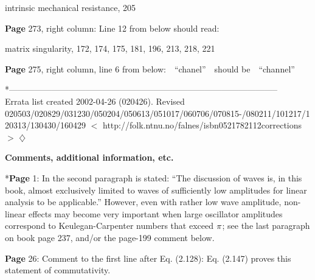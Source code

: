 \documentclass[a4paper,12pt]{article}
\begin{document}
intrinsic mechanical resistance, 205 %
\vspace{0.2cm}

\noindent %
{\bf Page} 273, right column: Line 12 from below should read: 

matrix singularity, 172, 174, 175, 181, 196, 213, 218, 221 %
\vspace{0.2cm}

\noindent %
{\bf Page} 275, right column, line 6 from below: \,\, ``chanel'' \,\, should be \,\, ``channel'' 
\vspace{0.1cm}

\noindent
*----------------------------------------------------------------------------------------------- \\
Errata list created 2002-04-26 (020426). %
\newline \noindent 
Revised 020503/020829/031230/050204/050613/051017/060706/070815-\newline/080211/101217/120313/130430/160429 %
\newline
$<$ http://folk.ntnu.no/falnes/isbn0521782112corrections $>$
\newline  
{$\diamondsuit$} %


\pagebreak %

\centerline{{\bf Comments, additional information, etc.}}

\vspace{0.3cm}

\noindent %
*{\bf Page} 1: In the second paragraph is stated: ``The discussion of waves is, in this book, almost exclusively limited to waves of sufficiently low amplitudes for linear analysis to be applicable.'' However, even with rather low wave amplitude, non-linear effects may become very important when large oscillator amplitudes correspond to Keulegan-Carpenter numbers that exceed $\rm{\pi}$; see the last paragraph on book page 237, and/or the page-199 comment below. 
\newline  {$\diamondsuit$}  \vspace{0.15cm} %

\noindent %
{\bf Page} 26: Comment to the first line after Eq. (2.128): Eq. (2.147) proves this statement of commutativity. %
\vspace{0.2cm}
\end{document}
